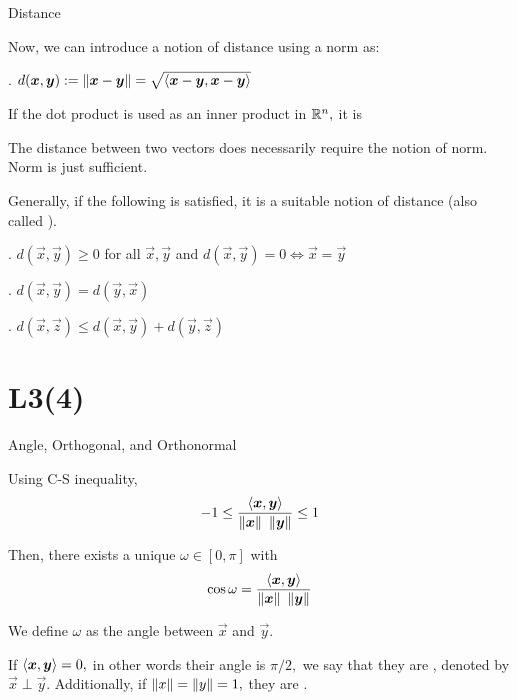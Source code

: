 \documentclass[handout,fleqn,aspectratio=169]{beamer}
\begin{document}
\begin{frame}{Distance}

\plitemsep 0.1in

\bci 

\item Now, we can introduce a notion of distance using a norm as:

\medskip
{}. $d(\bm{x},\bm{y}) := \left \lVert \bm{x} - \bm{y} \right \rVert = \sqrt{\left\langle \bm{x}-\bm{y}, \bm{x}-\bm{y} \right\rangle} $

\item If the dot product is used as an inner product in ${\mathbb R}^n,$ it is 

\item {} The distance between two vectors does  necessarily require the notion of norm. Norm is just sufficient. 

\item Generally, if the following is satisfied, it is a suitable notion of distance (also called ). 
\bci
\item {}. $d(\vec{x},\vec{y}) \ge 0$ for all $\vec{x},\vec{y}$ and $d(\vec{x},\vec{y}) = 0 \Longleftrightarrow \vec{x}=\vec{y}$ 
\item {}. $d(\vec{x},\vec{y}) = d(\vec{y},\vec{x})$
\item {}. $d(\vec{x},\vec{z}) \le d(\vec{x},\vec{y}) + d(\vec{y},\vec{z})$
\eci
\eci
\end{frame}

\section{L3(4)}
\begin{frame}{Angle,  Orthogonal, and Orthonormal}

\plitemsep 0.1in

\bci 

\item Using C-S inequality, $$-1 \le \frac{\left\langle \bm{x}, \bm{y} \right\rangle}{\left \lVert \bm{x} \right \rVert \ \left \lVert \bm{y} \right \rVert} \le 1$$

\item Then, there exists a unique $\omega \in [0,\pi]$ with $$\cos \omega = \frac{\inner{\vec{x}}{\vec{y}}}{\norm{\vec{x}} \ \norm{\vec{y}}}$$

\item We define $\omega$ as the angle between $\vec{x}$ and $\vec{y}.$

\item {} If $\left\langle \bm{x}, \bm{y} \right\rangle = 0,$ in other words their angle is $\pi/2,$ we say that they are , denoted by $\vec{x} \perp \vec{y}.$ Additionally, if $\left \lVert x \right \rVert = \left \lVert y \right \rVert =1,$ they are .
\eci
\end{frame}
\end{document}
